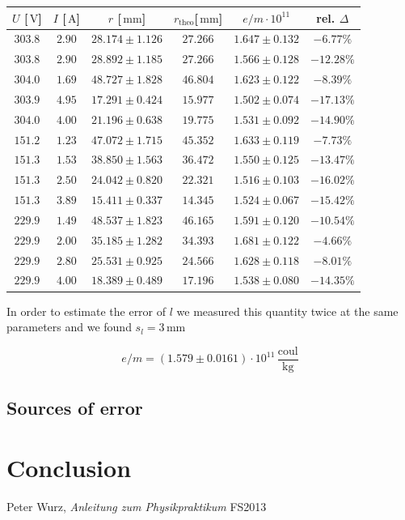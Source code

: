 \documentclass{scrreprt}
\newcommand{\unit}[1]{\ensuremath{\, \mathrm{#1}}}
\begin{document}
\begin{table}[H]
\center
\begin{tabular}{|c|c|c|c|c|c|}
\hline
$U$ [$\unit{V}$] & $I$ [$\unit{A}$] & $r$ [$\unit{mm}$] & $r_{\text{theo}}$[$\unit{mm}$] & $e/m \cdot 10^{11}$ & rel. $\Delta$\\ \hline\hline
$303.8$ & $2.90$ & $28.174 \pm 1.126$ & $27.266$ & $1.647 \pm 0.132$ & $-6.77 \%$\\
$303.8$ & $2.90$ & $28.892 \pm 1.185$ & $27.266$ & $1.566 \pm 0.128$ & $-12.28 \%$\\
$304.0$ & $1.69$ & $48.727 \pm 1.828$ & $46.804$ & $1.623 \pm 0.122$ & $-8.39 \%$\\
$303.9$ & $4.95$ & $17.291 \pm 0.424$ & $15.977$ & $1.502 \pm 0.074$ & $-17.13 \%$\\
$304.0$ & $4.00$ & $21.196 \pm 0.638$ & $19.775$ & $1.531 \pm 0.092$ & $-14.90 \%$\\
$151.2$ & $1.23$ & $47.072 \pm 1.715$ & $45.352$ & $1.633 \pm 0.119$ & $-7.73 \%$\\
$151.3$ & $1.53$ & $38.850 \pm 1.563$ & $36.472$ & $1.550 \pm 0.125$ & $-13.47 \%$\\
$151.3$ & $2.50$ & $24.042 \pm 0.820$ & $22.321$ & $1.516 \pm 0.103$ & $-16.02 \%$\\
$151.3$ & $3.89$ & $15.411 \pm 0.337$ & $14.345$ & $1.524 \pm 0.067$ & $-15.42 \%$\\
$229.9$ & $1.49$ & $48.537 \pm 1.823$ & $46.165$ & $1.591 \pm 0.120$ & $-10.54 \%$\\
$229.9$ & $2.00$ & $35.185 \pm 1.282$ & $34.393$ & $1.681 \pm 0.122$ & $-4.66 \%$\\
$229.9$ & $2.80$ & $25.531 \pm 0.925$ & $24.566$ & $1.628 \pm 0.118$ & $-8.01 \%$\\
$229.9$ & $4.00$ & $18.389 \pm 0.489$ & $17.196$ & $1.538 \pm 0.080$ & $-14.35 \%$\\
\hline
\end{tabular}
\end{table}

In order to estimate the error of $l$ we measured this quantity twice at the same parameters and we found $s_l = 3 \unit{mm}$

\begin{equation}
e/m = \left( 1.579 \pm 0.0161 \right)\cdot 10^{11} \unit{\frac{coul}{kg}}
\end{equation}

\subsection{Sources of error}
\label{sec:error}

\section{Conclusion}

\begin{thebibliography}{9}

  Peter Wurz,
  \emph{Anleitung zum Physikpraktikum}
  FS2013

\end{thebibliography}
\end{document}
